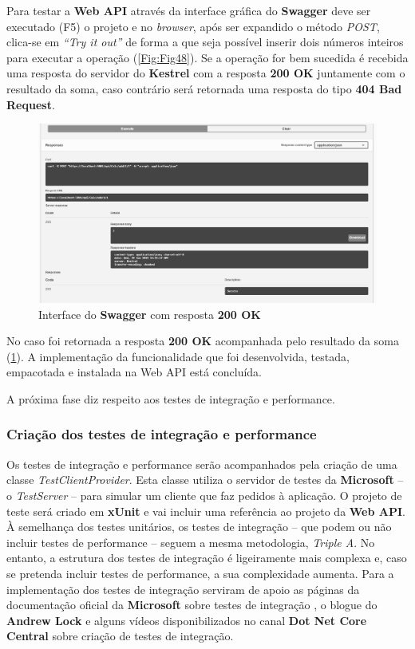 \hspace{1cm}Para testar a \textbf{Web API} através da interface gráfica do \textbf{Swagger} deve ser executado (F5) o projeto e no \textit{browser}, após ser expandido o método \textit{POST}, clica-se em \textit{``Try it out''} de forma a que seja possível inserir dois números inteiros para executar a operação (\ref{Fig:Fig48}). Se a operação for bem sucedida é recebida uma resposta do servidor do \textbf{Kestrel} \cite{kestrel} com a resposta \textbf{200 OK} juntamente com o resultado da soma, caso contrário será retornada uma resposta do tipo \textbf{404 Bad Request}.

\begin{figure}[hbt!]
\centering
\includegraphics[width=0.8\linewidth]{Cap5/Swagger2.png}
\caption{Interface do \textbf{Swagger} com resposta \textbf{200 OK}}
\label{Fig:Fig49}
\end{figure}

\hspace{1cm}No caso foi retornada a resposta \textbf{200 OK} acompanhada pelo resultado da soma (\ref{Fig:Fig49}). A implementação da funcionalidade que foi desenvolvida, testada, empacotada e instalada na Web API está concluída. 

A próxima fase diz respeito aos testes de integração e performance.

\subsubsection{Criação dos testes de integração e performance}

\hspace{1cm}Os testes de integração e performance serão acompanhados pela criação de uma classe \textit{TestClientProvider}. Esta classe utiliza o servidor de testes da \textbf{Microsoft} -- o \textit{TestServer} -- para simular um cliente que faz pedidos à aplicação. O projeto de teste será criado em \textbf{xUnit} e vai incluir uma referência ao projeto da \textbf{Web API}. À semelhança dos testes unitários, os testes de integração -- que podem ou não incluir testes de performance -- seguem a mesma metodologia, \textit{Triple A}. No entanto, a estrutura dos testes de integração é ligeiramente mais complexa e, caso se pretenda incluir testes de performance, a sua complexidade aumenta. Para a implementação dos testes de integração serviram de apoio as páginas da documentação oficial da \textbf{Microsoft} sobre testes de integração \cite{microsoftintegrationtesting}, o blogue do \textbf{Andrew Lock} \cite{andrewlockblog} e alguns vídeos disponibilizados no canal \textbf{Dot Net Core Central} \cite{dotnetcorecentral} sobre criação de testes de integração.


